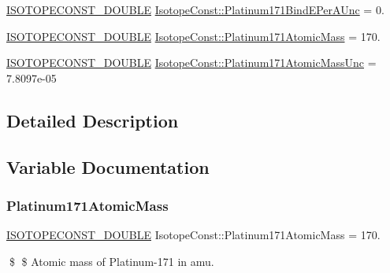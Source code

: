 \begin{DoxyCompactItemize}
\mbox{\hyperlink{group___isotope_const-_macros_ga8f45a7272ce02c0b4c65c44636ed719a}{I\+S\+O\+T\+O\+P\+E\+C\+O\+N\+S\+T\+\_\+\+D\+O\+U\+B\+LE}} \mbox{\hyperlink{group___isotope_const-_platinum-_pt171_ga86fa83ba13bd285e358af7678b619210}{Isotope\+Const\+::\+Platinum171\+Bind\+E\+Per\+A\+Unc}} = 0.
\item 
\mbox{\hyperlink{group___isotope_const-_macros_ga8f45a7272ce02c0b4c65c44636ed719a}{I\+S\+O\+T\+O\+P\+E\+C\+O\+N\+S\+T\+\_\+\+D\+O\+U\+B\+LE}} \mbox{\hyperlink{group___isotope_const-_platinum-_pt171_gaffe6bd2a31f0b5cd23cc4b8bf77a14c2}{Isotope\+Const\+::\+Platinum171\+Atomic\+Mass}} = 170.
\item 
\mbox{\hyperlink{group___isotope_const-_macros_ga8f45a7272ce02c0b4c65c44636ed719a}{I\+S\+O\+T\+O\+P\+E\+C\+O\+N\+S\+T\+\_\+\+D\+O\+U\+B\+LE}} \mbox{\hyperlink{group___isotope_const-_platinum-_pt171_gaf2dcc8cd306c9ddab9b8ef3ce3d843f4}{Isotope\+Const\+::\+Platinum171\+Atomic\+Mass\+Unc}} = 7.\+8097e-\/05
\end{DoxyCompactItemize}


\subsection{Detailed Description}


\subsection{Variable Documentation}
\mbox{\label{group___isotope_const-_platinum-_pt171_gaffe6bd2a31f0b5cd23cc4b8bf77a14c2}} 
\subsubsection{\texorpdfstring{Platinum171\+Atomic\+Mass}{Platinum171AtomicMass}}
{\footnotesize\ttfamily \mbox{\hyperlink{group___isotope_const-_macros_ga8f45a7272ce02c0b4c65c44636ed719a}{I\+S\+O\+T\+O\+P\+E\+C\+O\+N\+S\+T\+\_\+\+D\+O\+U\+B\+LE}} Isotope\+Const\+::\+Platinum171\+Atomic\+Mass = 170.}

\$ \$ Atomic mass of Platinum-\/171 in amu. \mbox{\label{group___isotope_const-_platinum-_pt171_gaf2dcc8cd306c9ddab9b8ef3ce3d843f4}} 

